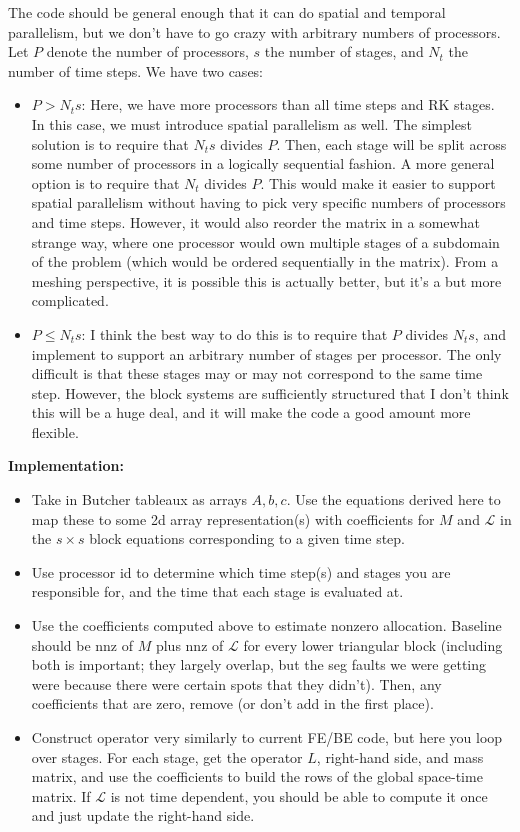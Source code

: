 \documentclass[a4paper,10pt]{article}
\begin{document}
The code should be general enough that it can do spatial and temporal parallelism, but we don't have to go crazy with
arbitrary numbers of processors. Let $P$ denote the number of processors, $s$ the number of stages, and 
$N_t$ the number of time steps. We have two cases:
%
\begin{itemize}
\item $P > N_ts$: Here, we have more processors than all time steps and RK stages. In this case, we must introduce
spatial parallelism as well. The simplest solution is to require that $N_ts$ divides $P$. Then, each stage will be split
across some number of processors in a logically sequential fashion. A more general option is to require that $N_t$
divides $P$. This would make it easier to support spatial parallelism without having to pick very specific numbers of
processors and time steps. However, it would also reorder the matrix in a somewhat strange way, where one processor
would own multiple stages of a subdomain of the problem (which would be ordered sequentially in the matrix). From a
meshing perspective, it is possible this is actually better, but it's a but more complicated.

\item $P \leq N_ts$: I think the best way to do this is to require that $P$ divides $N_ts$, and implement to support
an arbitrary number of stages per processor. The only difficult is that these stages may or may not correspond to
the same time step. However, the block systems are sufficiently structured that I don't think this will be a huge deal,
and it will make the code a good amount more flexible. 
\end{itemize}

\noindent\textbf{Implementation:}
\begin{itemize}
\item Take in Butcher tableaux as arrays $A,b,c$. Use the equations derived here to map these to some 2d array
representation(s) with coefficients for $M$ and $\mathcal{L}$ in the $s \times s$ block equations corresponding to
a given time step.

\item Use processor id to determine which time step(s) and stages you are responsible for, and the time that each
stage is evaluated at.

\item Use the coefficients computed above to estimate nonzero allocation. Baseline should be nnz of $M$ plus
nnz of $\mathcal{L}$ for every lower triangular block (including both is important; they largely overlap, but the
seg faults we were getting were because there were certain spots that they didn't). Then, any coefficients that
are zero, remove (or don't add in the first place).

\item Construct operator very similarly to current FE/BE code, but here you loop over stages. For each stage, get
the operator $L$, right-hand side, and mass matrix, and use the coefficients to build the rows of the global space-time
matrix. If $\mathcal{L}$ is not time dependent, you should be able to compute it once and just update the right-hand
side.



\end{itemize}
\end{document}
